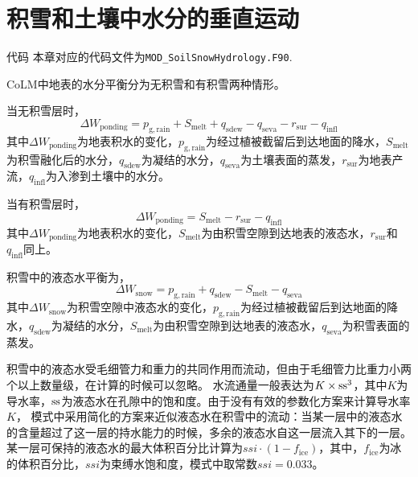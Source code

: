 \chapter{积雪和土壤中水分的垂直运动}\label{积雪和土壤中水分的垂直运动}

\begin{mymdframed}{代码}
  本章对应的代码文件为\texttt{MOD\_SoilSnowHydrology.F90}.
\end{mymdframed}

CoLM中地表的水分平衡分为无积雪和有积雪两种情形。

当无积雪层时，
\begin{equation}
  \Delta W_{\mathrm{ponding}} = p_{\mathrm{g,rain}}+S_{\mathrm{melt}}+q_{\mathrm{sdew}}-q_{\mathrm{seva}}-r_{\mathrm{sur}}-q_{\mathrm{infl}}
\end{equation}
其中$\Delta W_{\mathrm{ponding}}$为地表积水的变化，$p_{\mathrm{g,rain}}$为经过植被截留后到达地面的降水，$S_{\mathrm{melt}}$为积雪融化后的水分，$q_{\mathrm{sdew}}$为凝结的水分，$q_{\mathrm{seva}}$为土壤表面的蒸发，$r_{\mathrm{sur}}$为地表产流，$q_{\mathrm{infl}}$为入渗到土壤中的水分。

当有积雪层时，
\begin{equation}
  \Delta W_{\mathrm{ponding}} = S_{\mathrm{melt}}-r_{\mathrm{sur}}-q_{\mathrm{infl}}
\end{equation}
其中$\Delta W_{\mathrm{ponding}}$为地表积水的变化，$S_{\mathrm{melt}}$为由积雪空隙到达地表的液态水，$r_{\mathrm{sur}}$和$q_{\mathrm{infl}}$同上。

积雪中的液态水平衡为，
\begin{equation}
  \Delta W_{\mathrm{snow}} = p_{\mathrm{g,rain}}+q_{\mathrm{sdew}}-S_{\mathrm{melt}}-q_{\mathrm{seva}}
\end{equation}
其中$\Delta W_{\mathrm{snow}}$为积雪空隙中液态水的变化，$p_{\mathrm{g,rain}}$为经过植被截留后到达地面的降水，$q_{\mathrm{sdew}}$为凝结的水分，$S_{\mathrm{melt}}$为由积雪空隙到达地表的液态水，$q_{\mathrm{seva}}$为积雪表面的蒸发。

积雪中的液态水受毛细管力和重力的共同作用而流动，但由于毛细管力比重力小两个以上数量级，在计算的时候可以忽略。
水流通量一般表达为$K\times{\rm ss}^3$，其中$K$为导水率，${\rm ss}$为液态水在孔隙中的饱和度。由于没有有效的参数化方案来计算导水率$K$，
模式中采用简化的方案来近似液态水在积雪中的流动：当某一层中的液态水的含量超过了这一层的持水能力的时候，多余的液态水自这一层流入其下的一层。
某一层可保持的液态水的最大体积百分比计算为$ssi\cdot\left(1-f_{\mathrm{ice}}\right)$，其中，$f_{\mathrm{ice}}$为冰的体积百分比，$ssi$为束缚水饱和度，模式中取常数$ssi=0.033$。

